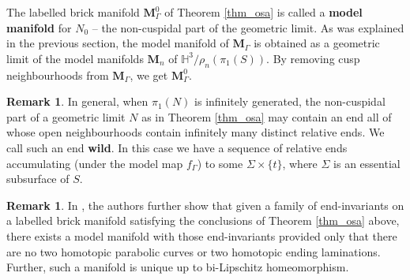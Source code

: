 \documentclass{amsart}
\theoremstyle{definition}
\newtheorem{rmk}[theorem]{Remark}
\newcommand\HHH{{\mathbb H}}
\begin{document}
The labelled brick manifold $\mathbf M^0_\Gamma$ of Theorem \ref{thm_osa}
is called a {\bf model manifold} for $N_0$ -- the
non-cuspidal part of the geometric limit. 
As was explained in the previous section, the model manifold of $\mathbf M_\Gamma$ is obtained as a geometric limit of the model manifolds $\mathbf M_n$ of $\HHH^3/\rho_n(\pi_1(S))$.
By removing cusp neighbourhoods from $\mathbf M_\Gamma$, we get $\mathbf M^0_\Gamma$.
 


\begin{rmk}
\label{wild}
	In general, when $\pi_1(N)$ is infinitely generated,
	the non-cuspidal part of a geometric limit $N$ as in Theorem \ref{thm_osa}   may contain an end all of whose open
	neighbourhoods contain infinitely many distinct relative ends.
	We call such an end {\bf wild}. In this case we have a sequence of relative ends accumulating (under the model map $f_\Gamma$) to some $\Sigma \times \{ t \}$, where $\Sigma$ is an essential subsurface  of $S$.
\end{rmk}

\begin{rmk}
\label{osrmk}
In \cite{OS}, the authors further show that given a family of end-invariants on a 
labelled brick manifold satisfying the conclusions of Theorem \ref{thm_osa} above,  there  exists a model manifold with those end-invariants provided only that there are no two homotopic parabolic curves or two homotopic ending laminations. Further, such a manifold is unique up to bi-Lipschitz homeomorphism.
\end{rmk}
\end{document}
